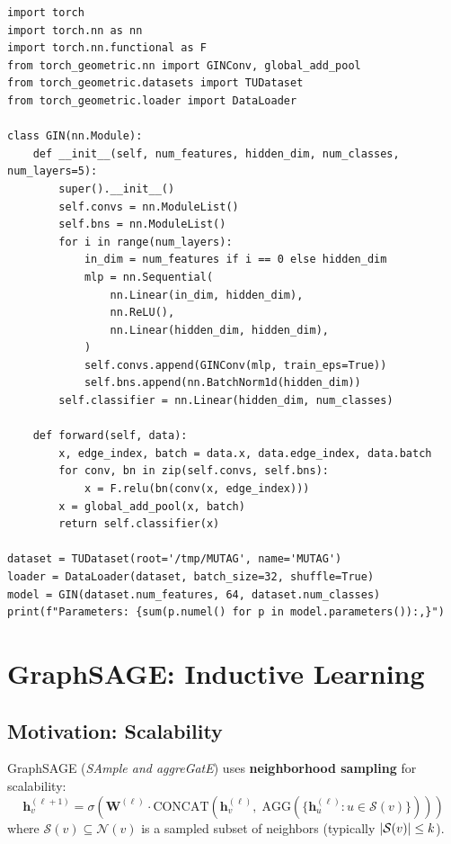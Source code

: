 \begin{codeblock}[title=\textbf{GIN implementation}]
\begin{verbatim}
import torch
import torch.nn as nn
import torch.nn.functional as F
from torch_geometric.nn import GINConv, global_add_pool
from torch_geometric.datasets import TUDataset
from torch_geometric.loader import DataLoader

class GIN(nn.Module):
    def __init__(self, num_features, hidden_dim, num_classes, num_layers=5):
        super().__init__()
        self.convs = nn.ModuleList()
        self.bns = nn.ModuleList()
        for i in range(num_layers):
            in_dim = num_features if i == 0 else hidden_dim
            mlp = nn.Sequential(
                nn.Linear(in_dim, hidden_dim),
                nn.ReLU(),
                nn.Linear(hidden_dim, hidden_dim),
            )
            self.convs.append(GINConv(mlp, train_eps=True))
            self.bns.append(nn.BatchNorm1d(hidden_dim))
        self.classifier = nn.Linear(hidden_dim, num_classes)

    def forward(self, data):
        x, edge_index, batch = data.x, data.edge_index, data.batch
        for conv, bn in zip(self.convs, self.bns):
            x = F.relu(bn(conv(x, edge_index)))
        x = global_add_pool(x, batch)
        return self.classifier(x)

dataset = TUDataset(root='/tmp/MUTAG', name='MUTAG')
loader = DataLoader(dataset, batch_size=32, shuffle=True)
model = GIN(dataset.num_features, 64, dataset.num_classes)
print(f"Parameters: {sum(p.numel() for p in model.parameters()):,}")
\end{verbatim}
\end{codeblock}

\section{GraphSAGE: Inductive Learning}

\subsection{Motivation: Scalability}

\begin{definition}
GraphSAGE (\textit{SAmple and aggreGatE}) uses \textbf{neighborhood sampling}
for scalability:
\[
    \mathbf{h}_v^{(\ell+1)} = \sigma\!\left(\mathbf{W}^{(\ell)} \cdot
    \text{CONCAT}\!\left(\mathbf{h}_v^{(\ell)},\;
    \text{AGG}(\{\mathbf{h}_u^{(\ell)} : u \in \mathcal{S}(v)\})\right)\right)
\]
where $\mathcal{S}(v) \subseteq \mathcal{N}(v)$ is a sampled subset of
neighbors (typically $\left| \mathcal{S}(v) \right| \leq k$).
\end{definition}


